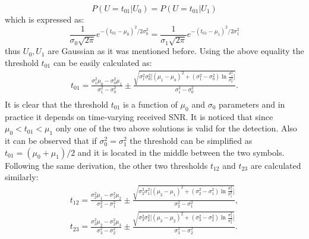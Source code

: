 \documentclass[journal]{IEEEtran}
\begin{document}
\begin{equation}
P( U=t_\text{01}|U_\text{0})=P(U=t_\text{01}|U_\text{1})
\end{equation}
 which is expressed  as: 
\begin{equation}
\frac{1}{{\sigma_\text{0} \sqrt {2\pi}}} e^{-\left( {t_\text{01} - \mu_\text{0} } \right)^2 /2\sigma_\text{0}^2} = \frac{1}{{\sigma_\text{1} \sqrt {2\pi}}} e^{-\left( {t_\text{01} - \mu_\text{1} } \right)^2 /2\sigma_\text{1}^2}
\end{equation}
%
thus $U_\text{0}, U_\text{1}$ are Gaussian as it was mentioned before.
%
Using the above equality the threshold $t_\text{01}$ can be easily calculated as:
%
\begin{equation}
\begin{gathered}
t_\text{01} = \frac{\sigma_\text{1}^2 \mu_\text{0}-\sigma_\text{0}^2 \mu_\text{1}} {\sigma_\text{1}^2 - \sigma_\text{0}^2}\pm \frac{\sqrt{\sigma_\text{1}^2 \sigma_\text{0}^2 
\Big[(\mu_\text{1}-\mu_\text{0})^2 +(\sigma_\text{1}^2 - \sigma_\text{0}^2 )\ln \frac{\sigma_\text{1}^2}{\sigma_\text{0}^2}\Big] }} 
{\sigma_\text{1}^2 - \sigma_\text{0}^2}.\\
\end{gathered}
\label{eq:t01}
\end{equation}
%
It is clear that the threshold  $t_\text{01}$ is a function of  $\mu_\text{0}$ and $\sigma_\text{0}$ parameters and in practice it depends on time-varying received SNR. 
%
It  is noticed that since  $\mu_\text{0} <t_\text{01}< \mu_\text{1}$ only one  of the two above solutions is valid for the detection. 
%
Also it can be observed that if $\sigma_\text{0}^2=\sigma_\text{1}^2$ 
the threshold can be simplified as $t_\text{01} = (\mu_\text{0}+\mu_\text{1})/2$
and it is located  in the middle between the two symbols.
% 
Following the same derivation, the other two thresholds  $t_\text{12}$ and  $t_\text{23}$  are calculated similarly:
\begin{equation}
\begin{gathered}
t_\text{12} = \frac{\sigma_\text{2}^2 \mu_\text{1}-\sigma_\text{1}^2 \mu_\text{2}} {\sigma_\text{2}^2 - \sigma_\text{1}^2}\pm \frac{\sqrt{\sigma_\text{2}^2 \sigma_\text{1}^2 
\Big[(\mu_\text{2}-\mu_\text{1})^2 +(\sigma_\text{2}^2 - \sigma_\text{1}^2 )\ln \frac{\sigma_\text{2}^2}{\sigma_\text{1}^2}\Big] }} 
{\sigma_\text{2}^2 - \sigma_\text{1}^2},\\
t_\text{23} = \frac{\sigma_\text{3}^2 \mu_\text{2}-\sigma_\text{2}^2 \mu_\text{3}} {\sigma_\text{3}^2 - \sigma_\text{2}^2}\pm \frac{\sqrt{\sigma_\text{3}^2 \sigma_\text{2}^2 
\Big[(\mu_\text{3}-\mu_\text{2})^2 +(\sigma_\text{3}^2 - \sigma_\text{2}^2 )\ln \frac{\sigma_\text{3}^2}{\sigma_\text{2}^2}\Big] }} 
{\sigma_\text{3}^2 - \sigma_\text{2}^2}.
\end{gathered}
\label{eq:thres1}
\end{equation}
\end{document}
